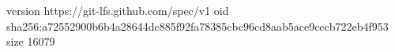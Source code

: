 version https://git-lfs.github.com/spec/v1
oid sha256:a72552900b6b4a28644dc885f92fa78385cbc96cd8aab5ace9cccb722eb4f953
size 16079
